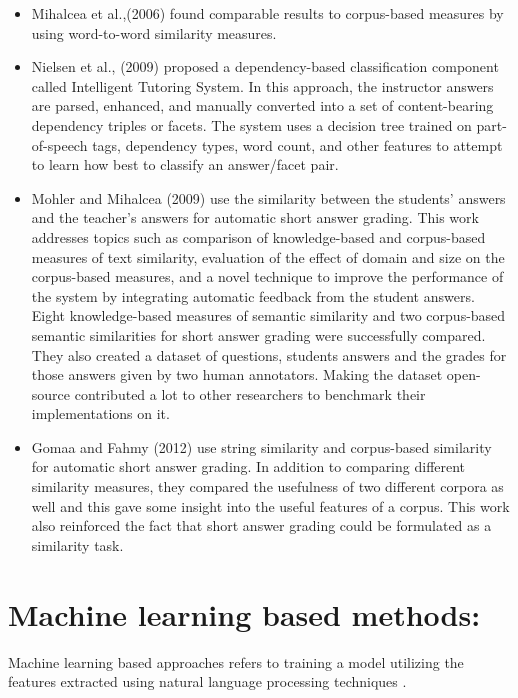 \documentclass[rnd]{mas_proposal}
\begin{document}
\begin{itemize}
	\item Mihalcea et al.,(2006) \cite{Mihalcea2006} found comparable results to corpus-based measures by using word-to-word similarity measures.
	\item Nielsen et al., (2009) \cite{Nielsen2009}proposed a dependency-based classification component called Intelligent Tutoring System. In this approach, the instructor answers are parsed, enhanced, and manually converted into a set of content-bearing dependency triples or facets. The system uses a decision tree trained on part-of-speech tags, dependency types, word count, and other features to attempt to learn how best to classify an answer/facet pair.
	 \item Mohler and Mihalcea (2009) \cite{Mohler2009} use the similarity between the students’ answers and the teacher’s answers for automatic short answer grading. This work addresses topics such as comparison of knowledge-based and corpus-based measures of text similarity, evaluation of the effect of domain and size on the corpus-based measures, and a novel technique to improve the performance of the system by integrating automatic feedback from the student answers. Eight knowledge-based measures of semantic similarity and two corpus-based semantic similarities for short answer grading were successfully compared. They also created a dataset of questions, students answers and the grades for those answers given by two human annotators. Making the dataset open-source contributed a lot to other researchers to benchmark their implementations on it.
	 \item Gomaa and Fahmy (2012) \cite{Gomaa2012} use string similarity and corpus-based similarity for automatic short answer grading. In addition to comparing different similarity measures, they compared the usefulness of two different corpora as well and this gave some insight into the useful features of a corpus. This work also reinforced the fact that short answer grading could be formulated as a similarity task.
	 
	\end{itemize}

\section{Machine learning based methods:}

Machine learning based approaches refers to training a model utilizing the features extracted using  natural language processing techniques \cite{Burrows2015}.
\end{document}
